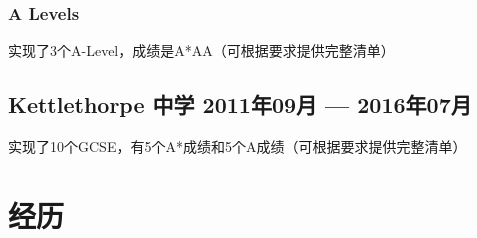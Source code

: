 \documentclass[10pt]{extarticle}
\begin{document}
            \subsubsection{A Levels}
            实现了3个A-Level，成绩是A*AA（可根据要求提供完整清单）
            \begin{comment}
                \begin{tabular}{cccc}
                    \textbf{Subject} & \textbf{Exam Board} & \textbf{AS/A2} &
                    \textbf{Grade}\\
                    Mathematics & AQA & A2 & A* \\
                    Further Mathematics & AQA & A2 & A \\
                    Computer Science & OCR & A2 & A \\
                    Physics & AQA & AS & A
                \end{tabular}
            \end{comment}
        \subsection{Kettlethorpe 中学 %
            \hfill 2011年09月 --- 2016年07月}
            实现了10个GCSE，有5个A*成绩和5个A成绩（可根据要求提供完整清单）
    \section{经历} %
\end{document}
